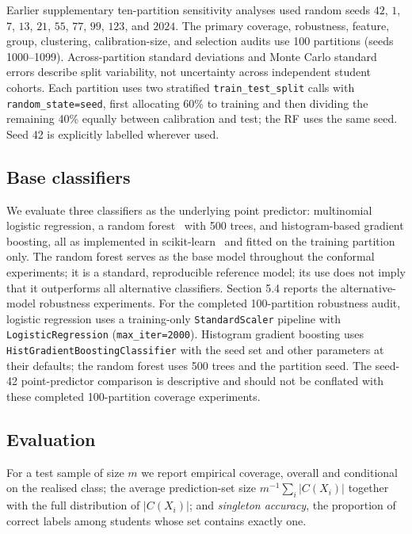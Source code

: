 Earlier supplementary ten-partition sensitivity analyses used random seeds
$42$, $1$, $7$, $13$, $21$, $55$, $77$, $99$, $123$, and $2024$.
The primary coverage, robustness, feature, group, clustering, calibration-size, and selection audits
use 100 partitions (seeds 1000--1099). Across-partition standard deviations
and Monte Carlo standard errors describe split variability, not uncertainty
across independent student cohorts. Each partition uses two stratified
\texttt{train\_test\_split} calls with \texttt{random\_state=seed},
first allocating 60\% to training and then dividing the remaining 40\%
equally between calibration and test; the RF uses the same seed. Seed 42
is explicitly labelled wherever used.

\subsection{Base classifiers}

We evaluate three classifiers as the underlying point predictor: multinomial
logistic regression, a random forest~\cite{breiman2001} with 500 trees, and
histogram-based gradient boosting, all as implemented in
scikit-learn~\cite{pedregosa2011} and fitted on the training partition only. The
random forest serves as the base model throughout the conformal experiments; it
is a standard, reproducible reference model; its use does not imply
that it outperforms all alternative classifiers. Section 5.4 reports the alternative-model robustness experiments.
For the completed 100-partition robustness audit, logistic regression uses a training-only
\texttt{StandardScaler} pipeline with \texttt{LogisticRegression}
(\texttt{max\_iter=2000}). Histogram gradient boosting uses
\texttt{HistGradientBoostingClassifier} with the seed set and other
parameters at their defaults; the random forest uses 500 trees and the
partition seed. The seed-42 point-predictor comparison is descriptive and should not be
conflated with these completed 100-partition coverage experiments.

\subsection{Evaluation}

For a test sample of size $m$ we report empirical coverage, overall and
conditional on the realised class; the average prediction-set size
$m^{-1}\sum_i |C(X_i)|$ together with the full distribution of $|C(X_i)|$; and
\emph{singleton accuracy}, the proportion of correct labels among students whose
set contains exactly one.

